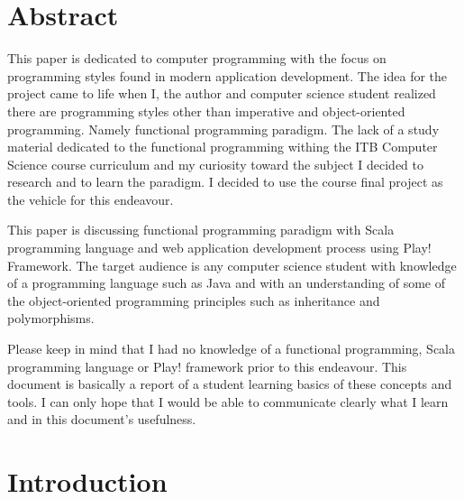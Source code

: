 \documentclass[12pt,twoside,a4paper]{report}
\begin{document}
\chapter*{Abstract}
This paper is dedicated to computer programming with the focus on programming styles found in modern application development. The idea for the project came to life when I, the author and computer science student realized there are programming styles other than imperative and object-oriented programming. Namely functional programming paradigm. The lack of a study material dedicated to the functional programming withing the ITB Computer Science course curriculum and my curiosity toward the subject I decided to research and to learn the paradigm. I decided to use the course final project as the vehicle for this endeavour.\par
This paper is discussing functional programming paradigm with Scala programming language and web application development process using Play! Framework. The target audience is any computer science student with knowledge of a programming language such as Java and with an understanding of some of the object-oriented programming principles such as inheritance and polymorphisms.\par
Please keep in mind that I had no knowledge of a functional programming, Scala programming language or Play! framework prior to this endeavour. This document is basically a report of a student learning basics of these concepts and tools. I can only hope that I would be able to communicate clearly what I learn and in this document's usefulness.

\listoffigures
\tableofcontents{}











\chapter{Introduction}\label{1}

\end{document}
